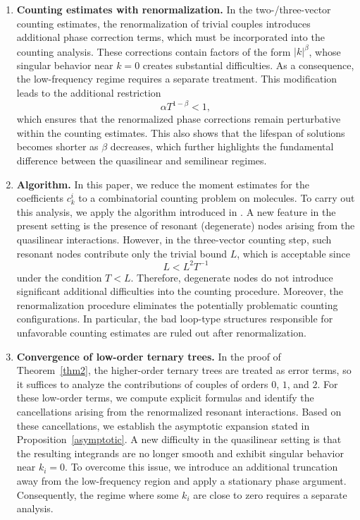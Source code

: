 \documentclass[UTF-8,reqno]{amsart}
\numberwithin{equation}{section}
\theoremstyle{definition}
\begin{document}
\begin{enumerate}
\item \textbf{Counting estimates with renormalization.} 
In the two-/three-vector counting estimates, the renormalization of trivial couples introduces additional phase correction terms, which must be incorporated into the counting analysis. 
These corrections contain factors of the form $|k|^\beta$, whose singular behavior near $k=0$ creates substantial difficulties. 
As a consequence, the low-frequency regime requires a separate treatment. 
This modification leads to the additional restriction
\[
\alpha T^{1-\beta}<1,
\]
which ensures that the renormalized phase corrections remain perturbative within the counting estimates.  This also shows that the lifespan of solutions becomes shorter as $\beta$ decreases, which further highlights the fundamental difference between the quasilinear and semilinear regimes.
  \item \textbf{Algorithm.} 
In this paper, we reduce the moment estimates for the coefficients $c_k^i$ to a combinatorial counting problem on molecules. 
To carry out this analysis, we apply the algorithm introduced in \cite{Vas24}. 
A new feature in the present setting is the presence of resonant (degenerate) nodes arising from the quasilinear interactions. 
However, in the three-vector counting step, such resonant nodes contribute only the trivial bound $L$, which is acceptable since
\[
L <L^2 T^{-1}
\]
under the condition $T<L$. Therefore, degenerate nodes do not introduce significant additional difficulties into the counting procedure. 
Moreover, the renormalization procedure eliminates the potentially problematic counting configurations. 
In particular, the bad loop-type structures responsible for unfavorable counting estimates are ruled out after renormalization.  

 \item  \textbf{Convergence of low-order ternary trees.} 
In the proof of Theorem~\ref{thm2}, the higher-order ternary trees are treated as error terms, 
so it suffices to analyze the contributions of couples of orders $0$, $1$, and $2$. 
For these low-order terms, we compute explicit formulas and identify the cancellations arising from the renormalized resonant interactions. 
Based on these cancellations, we establish the asymptotic expansion stated in Proposition~\ref{asymptotic}. 
A new difficulty in the quasilinear setting is that the resulting integrands are no longer smooth and exhibit singular behavior near $k_i=0$. 
To overcome this issue, we introduce an additional truncation away from the low-frequency region and apply a stationary phase argument. 
Consequently, the regime where some $k_i$ are close to zero requires a separate analysis.
\end{enumerate}
\end{document}
